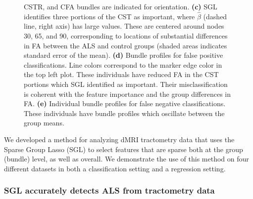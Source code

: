 \documentclass[10pt,%
               aps,%
               prl,%
               preprint,%
               superscriptaddress,%
               preprintnumbers,%
               amsmath,%
               floatfix,%
               endfloats*]{revtex4-1}
\begin{document}
\begin{figure}
{        CSTR, and CFA bundles are indicated for orientation.
        {\bf (c)} SGL identifies three portions of the CST as important,
        where $\hat{\beta}$ (dashed line, right axis) has large values. These
        are centered around nodes 30, 65, and 90, corresponding to locations
        of substantial differences in FA between the ALS and control groups
        (shaded areas indicates standard error of the mean).
        {\bf (d)} Bundle profiles for false positive classifications. Line
        colors correspond to the marker edge color in the top left plot.
        These individuals have reduced FA in the CST portions which SGL
        identified as important. Their misclassification is coherent with the
        feature importance and the group differences in FA.
        {\bf (e)} Individual bundle profiles for false negative
        classifications. These individuals have bundle profiles which
        oscillate between the group means.
    }
\end{figure}

We developed a method for analyzing dMRI tractometry data that uses the Sparse
Group Lasso (SGL) to select features that are sparse both at the group (bundle) level, as well as overall.
We demonstrate the use of this method on four different datasets in
both a classification setting and a regression setting.

\subsubsection*{SGL accurately detects ALS from tractometry data}
\end{document}
